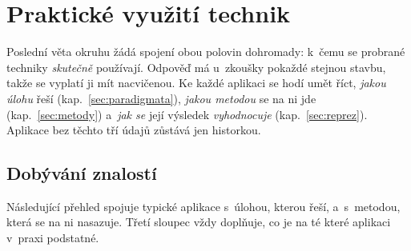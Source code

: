 \documentclass[11pt,a4paper]{article}
\theoremstyle{definition}
\begin{document}
\newpage
\section{Praktické využití technik}
\label{sec:praxe}

Poslední věta okruhu žádá spojení obou polovin dohromady: k~čemu se probrané techniky
\emph{skutečně} používají. Odpověď má u~zkoušky pokaždé stejnou stavbu, takže se vyplatí ji mít
nacvičenou. Ke každé aplikaci se hodí umět říct, \emph{jakou úlohu} řeší
(kap.~\ref{sec:paradigmata}), \emph{jakou metodou} se na ni jde (kap.~\ref{sec:metody})
a~\emph{jak se} její výsledek \emph{vyhodnocuje} (kap.~\ref{sec:reprez}). Aplikace bez těchto
tří údajů zůstává jen historkou.

\subsection{Dobývání znalostí}

Následující přehled spojuje typické aplikace s~úlohou, kterou řeší, a~s~metodou, která se na ni
nasazuje. Třetí sloupec vždy doplňuje, co je na té které aplikaci v~praxi podstatné.
\end{document}
